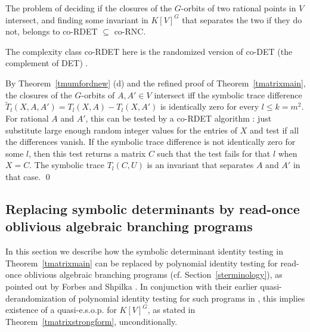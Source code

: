 \documentclass[11pt]{article}
\begin{document}
\begin{theorem} \label{torbitclosure}
The problem of deciding if the closures of the $G$-orbits of two rational points in $V$ intersect, and finding some invariant in $K[V]^G$ that separates the two
if they do not,  belongs to co-RDET $\subseteq$ co-RNC.
\end{theorem}

The complexity class co-RDET here is the randomized version of co-DET (the complement of DET) \cite{cook}.

\proof By Theorem~\ref{tmumfordnew} (d) and the refined proof of Theorem~\ref{tmatrixmain},
the closures of the $G$-orbits of $A, A' \in V$ intersect iff 
the symbolic trace difference $\tilde T_l(X,A,A')=T_l(X,A)-T_l(X,A')$ 
is identically zero for every  $l \le k=m^2$. For rational $A$ and $A'$, this can  be tested by 
a co-RDET algorithm \cite{ibarra}:
just substitute large enough random integer values for the entries of $X$ and test if all the differences vanish.
If the symbolic trace difference is not identically zero for some $l$, then this test 
returns a matrix $C$ such that the test fails for that  $l$ when $X=C$.
The symbolic trace $T_l(C,U)$ is an invariant that separates $A$ and $A'$ in that case.
\qed

\subsection{Replacing symbolic determinants by read-once oblivious algebraic branching programs} 
\label{sforbes}
In this section we describe how the symbolic determinant identity testing
in Theorem~\ref{tmatrixmain} can be replaced by polynomial identity testing
for  read-once oblivious algebraic branching programs (cf. Section~\ref{sterminology}), 
as pointed out by Forbes and Shpilka \cite{fs3}. In conjunction with their
earlier quasi-derandomization of polynomial identity testing for
such programs in \cite{fs2}, 
this implies  existence of  a quasi-e.s.o.p.
for $K[V]^G$, as stated in Theorem~\ref{tmatrixstrongform},  unconditionally.
\end{document}
